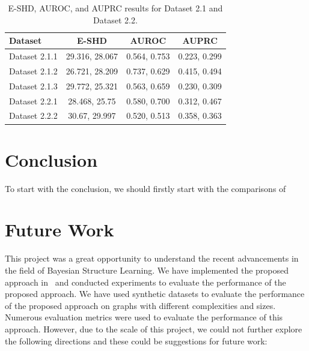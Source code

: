 \documentclass{lxaiproposal}
\begin{document}
    \begin{table}[h]
        \centering
        \begin{tabular}{|l|c|c|c|}
            \hline
            \textbf{Dataset} & \textbf{E-SHD} & \textbf{AUROC} & \textbf{AUPRC} \\
            \hline
            Dataset 2.1.1    & 29.316, 28.067 & 0.564, 0.753   & 0.223, 0.299   \\
            Dataset 2.1.2    & 26.721, 28.209 & 0.737, 0.629   & 0.415, 0.494   \\
            Dataset 2.1.3    & 29.772, 25.321 & 0.563, 0.659   & 0.230, 0.309   \\
            Dataset 2.2.1    & 28.468, 25.75  & 0.580, 0.700   & 0.312, 0.467   \\
            Dataset 2.2.2    & 30.67, 29.997  & 0.520, 0.513   & 0.358, 0.363   \\
            \hline
        \end{tabular}
        \caption{E-SHD, AUROC, and AUPRC results for Dataset 2.1 and Dataset 2.2.}
        \label{tab:metrics_dataset_2}


        \section{Conclusion}\label{sec:conclusion}
        \vspace*{-3mm}

        To start with the conclusion, we should firstly start with the comparisons of


        \section{Future Work}\label{sec:future_work}
        \vspace*{-3mm}

        This project was a great opportunity to understand the recent advancements in the field of Bayesian Structure
        Learning. We have implemented the proposed approach in~\cite{deleu2022daggflownet} and conducted experiments to
        evaluate the performance of the proposed approach. We have used synthetic datasets to evaluate the performance of
        the proposed approach on graphs with different complexities and sizes. Numerous evaluation metrics were used to
        evaluate the performance of this approach. However, due to the scale of this project, we could not further
        explore the following directions and these could be suggestions for future work:


\end{table}
\end{document}
